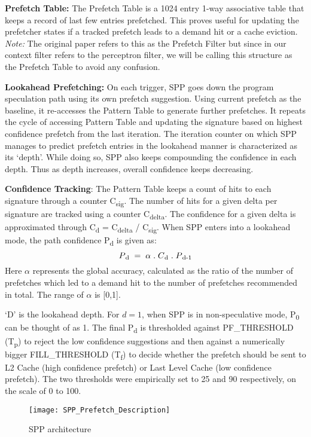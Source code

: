 \textbf{Prefetch Table:} The Prefetch Table is a 1024 entry 1-way associative
table that keeps a record of last few entries prefetched.  This proves useful
for updating the prefetcher states if a tracked prefetch leads to a demand hit
or a cache eviction. \textit{Note:} The original paper refers to this as the
Prefetch Filter but since in our context filter refers to the perceptron
filter, we will be calling this structure as the Prefetch Table to avoid any
confusion.

\textbf{Lookahead Prefetching:} On each trigger, SPP goes down the program
speculation path using its own prefetch suggestion.  Using current prefetch as
the baseline, it re-accesses the Pattern Table to generate further prefetches.
It repeats the cycle of accessing Pattern Table and updating the signature
based on highest confidence prefetch from the last iteration.  The iteration
counter on which SPP manages to predict prefetch entries in the lookahead
manner is characterized as its `depth'.  While doing so, SPP also keeps
compounding the confidence in each depth.  Thus as depth increases, overall
confidence keeps decreasing.

\textbf{Confidence Tracking}: The Pattern Table keeps a count of hits to each
signature through a counter C\textsubscript{sig}.  The number of hits for a
given delta per signature are tracked using a counter C\textsubscript{delta}.
The confidence for a given delta is approximated through C\textsubscript{d} =
C\textsubscript{delta} / C\textsubscript{sig}.  When SPP enters into a
lookahead mode, the path confidence P\textsubscript{d} is given as:
$$P\textsubscript{d} \;=\; \alpha  \;.\;  C\textsubscript{d}  \;.\;
P\textsubscript{d-1}$$ Here $\alpha$ represents the global accuracy,
calculated as the ratio of the number of prefetches which led to a demand hit
to the number of prefetches recommended in total. The range of $\alpha$ is
[0,1].

`D' is the lookahead depth. For $d = 1$, when SPP is in
non-speculative mode, P\textsubscript{0} can be thought of as 1. 
The final P\textsubscript{d} is thresholded against PF\_THRESHOLD 
(T\textsubscript{p}) to reject the low confidence suggestions and 
then against a numerically bigger FILL\_THRESHOLD (T\textsubscript{f}) to 
decide whether the prefetch should be sent to L2 Cache 
(high confidence prefetch) or Last Level Cache (low confidence prefetch).
The two thresholds were empirically set to 25 and 90 respectively, 
on the scale of 0 to 100.  

\begin{figure}
  \begin{center}
  \texttt{[image: SPP\_Prefetch\_Description]}
    \label{fig:spp_strcture}
  \caption{SPP architecture}
  \end{center}
\end{figure}

